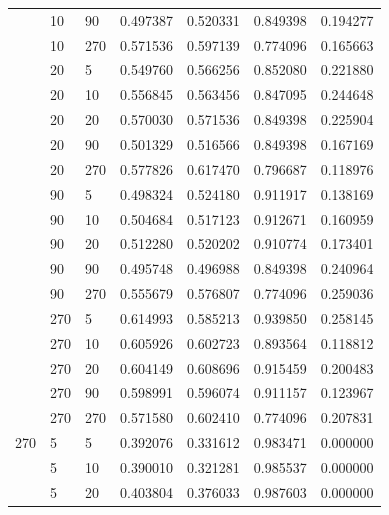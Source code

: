\documentclass[pageno]{jpaper}
\begin{document}
\begin{longtable}{p{2cm} p{2cm} p{2cm} p{2cm} p{2cm} p{2cm} p{2cm}}
& 10 & 90 & 0.497387 & 0.520331 & 0.849398 & 0.194277 \\

& 10 & 270 & 0.571536 & 0.597139 & 0.774096 & 0.165663 \\

& 20 & 5 & 0.549760 & 0.566256 & 0.852080 & 0.221880 \\

& 20 & 10 & 0.556845 & 0.563456 & 0.847095 & 0.244648 \\

& 20 & 20 & 0.570030 & 0.571536 & 0.849398 & 0.225904 \\

& 20 & 90 & 0.501329 & 0.516566 & 0.849398 & 0.167169 \\

& 20 & 270 & 0.577826 & 0.617470 & 0.796687 & 0.118976 \\

& 90 & 5 & 0.498324 & 0.524180 & 0.911917 & 0.138169 \\

& 90 & 10 & 0.504684 & 0.517123 & 0.912671 & 0.160959 \\

& 90 & 20 & 0.512280 & 0.520202 & 0.910774 & 0.173401 \\

& 90 & 90 & 0.495748 & 0.496988 & 0.849398 & 0.240964 \\

& 90 & 270 & 0.555679 & 0.576807 & 0.774096 & 0.259036 \\

& 270 & 5 & 0.614993 & 0.585213 & 0.939850 & 0.258145 \\

& 270 & 10 & 0.605926 & 0.602723 & 0.893564 & 0.118812 \\

& 270 & 20 & 0.604149 & 0.608696 & 0.915459 & 0.200483 \\

& 270 & 90 & 0.598991 & 0.596074 & 0.911157 & 0.123967 \\

& 270 & 270 & 0.571580 & 0.602410 & 0.774096 & 0.207831 \\
\hline
270 & 5 & 5 & 0.392076 & 0.331612 & 0.983471 & 0.000000 \\

& 5 & 10 & 0.390010 & 0.321281 & 0.985537 & 0.000000 \\

& 5 & 20 & 0.403804 & 0.376033 & 0.987603 & 0.000000 \\


\end{longtable}
\end{document}
